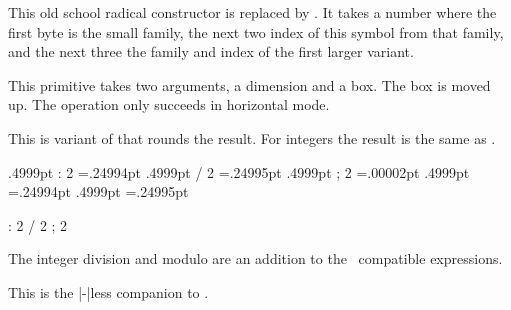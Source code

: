 \stopnewprimitive

\startoldprimitive[title={\prm {radical}}][obsolete=yes]

This old school radical constructor is replaced by . It takes a
number where the first byte is the small family, the next two index of this
symbol from that family, and the next three the family and index of the first
larger variant.

\stopoldprimitive

\startoldprimitive[title={\prm {raise}}]

This primitive takes two arguments, a dimension and a box. The box is moved up.
The operation only succeeds in horizontal mode.

\stopoldprimitive

\startnewprimitive[title={\prm {rdivide}}]

This is variant of  that rounds the result. For integers the result
is the same as .

\startbuffer
\the\dimexpr .4999pt                     : 2 \relax            =.24994pt
\the\dimexpr .4999pt                     / 2 \relax            =.24995pt
\the\dimexpr .4999pt                     ; 2 \relax            =.00002pt
\scratchdimen.4999pt \divide {} \the\scratchdimen =.24994pt
\scratchdimen.4999pt \edivide{} \the\scratchdimen =.24995pt
\scratchdimen 4999pt \rdivide{} \the\scratchdimen =2500.0pt
\scratchdimen 5000pt \rdivide{} \the\scratchdimen =2500.0pt

\the{}                       : 2 
\the{}                       / 2 
\the{}                       ; 2 
 \divide {} \the{}
 \edivide{} \the{}
 \rdivide{} \the{}
\stopbuffer

\typebuffer

\startlines
\getbuffer
\stoplines

The integer division \type{:} and modulo \type {;} are an addition to the \ETEX\
compatible expressions.

\stopnewprimitive

\startnewprimitive[title={\prm {rdivideby}}]

This is the |-|less companion to .

